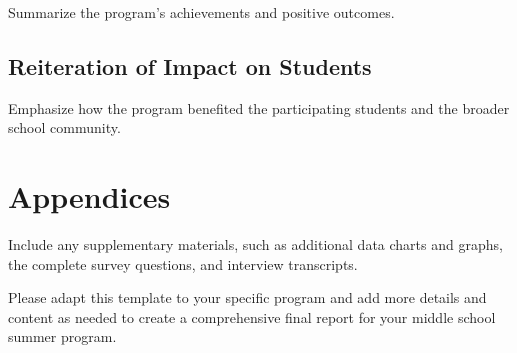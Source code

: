 \documentclass[
]{article}
\begin{document}
Summarize the program's achievements and positive outcomes.

\hypertarget{reiteration-of-impact-on-students}{%
\subsection{Reiteration of Impact on
Students}\label{reiteration-of-impact-on-students}}

Emphasize how the program benefited the participating students and the
broader school community.

\hypertarget{appendices}{%
\section{Appendices}\label{appendices}}

Include any supplementary materials, such as additional data charts and
graphs, the complete survey questions, and interview transcripts.

Please adapt this template to your specific program and add more details
and content as needed to create a comprehensive final report for your
middle school summer program.
\end{document}

